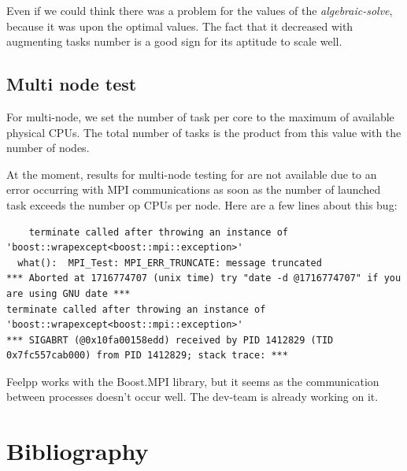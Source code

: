 \documentclass[12pt]{article}
\begin{document}
Even if we could think there was a problem for the values of the \textit{algebraic-solve}, because it was upon the optimal values.
The fact that it decreased with augmenting tasks number is a good sign for its aptitude to scale well.

\subsection{Multi node test}
For multi-node, we set the number of task per core to the maximum of available physical CPUs.
The total number of tasks is the product from this value with the number of nodes.

At the moment, results for multi-node testing for are not available due to an error occurring with MPI communications as soon as the number of launched task exceeds the number op CPUs per node.
Here are a few lines about this bug:

\begin{scriptsize}
\begin{verbatim}
    terminate called after throwing an instance of 'boost::wrapexcept<boost::mpi::exception>'
  what():  MPI_Test: MPI_ERR_TRUNCATE: message truncated
*** Aborted at 1716774707 (unix time) try "date -d @1716774707" if you are using GNU date ***
terminate called after throwing an instance of 'boost::wrapexcept<boost::mpi::exception>'
*** SIGABRT (@0x10fa00158edd) received by PID 1412829 (TID 0x7fc557cab000) from PID 1412829; stack trace: ***
\end{verbatim}
\end{scriptsize}

Feelpp works with the Boost.MPI library, but it seems as the communication between processes doesn't occur well.
The dev-team is already working on it.

\newpage
\section{Bibliography}
\nocite{*}
\printbibliography[heading=none]
\end{document}
